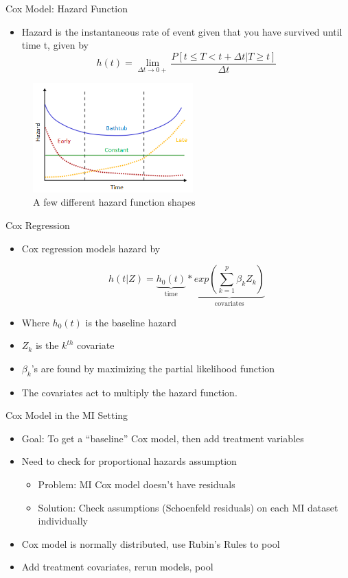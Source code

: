 \begin{frame}{Cox Model: Hazard Function}
\begin{itemize}
 \item Hazard is the instantaneous rate of event given that you have survived until time t, given 
 by $$h(t)=\lim_{\Delta t \rightarrow 0+}\frac{P[t\leq T<t+\Delta t|T\geq t]}{\Delta t}$$
\end{itemize}
 \begin{figure}[h!]
  \centering
    \includegraphics[width=0.55\textwidth]{hazard.png}
  \caption{A few different hazard function shapes \cite{wikihazard}}
\label{fig:hazard}
\end{figure}
\end{frame}

\begin{frame}{Cox Regression}
\begin{itemize}
   \item Cox regression models hazard by 
   
   $$h(t|Z)=\underbrace{h_{0}(t)}_{\textrm{time}}*\underbrace{exp(\sum_{k=1}^{p}\beta_{k}Z_{k})}_{\textrm{covariates}}$$

   \item Where $h_{0}(t)$ is the baseline hazard
   \item $Z_k$ is the $k^{th}$ covariate
   \item $\beta_k$'s are found by maximizing the partial likelihood function
\item The covariates act to multiply the hazard function.
\end{itemize}
\end{frame}


\begin{frame}{Cox Model in the MI Setting}
\begin{itemize}
 \item Goal: To get a ``baseline'' Cox model, then add treatment variables
 \item Need to check for proportional hazards assumption
 \begin{itemize}
  \item Problem:  MI Cox model doesn't have residuals
  \item Solution: Check assumptions (Schoenfeld residuals) on each MI dataset individually
 \end{itemize}
\item Cox model is normally distributed, use Rubin's Rules to pool
\item Add treatment covariates, rerun models, pool
\end{itemize}
\end{frame}


